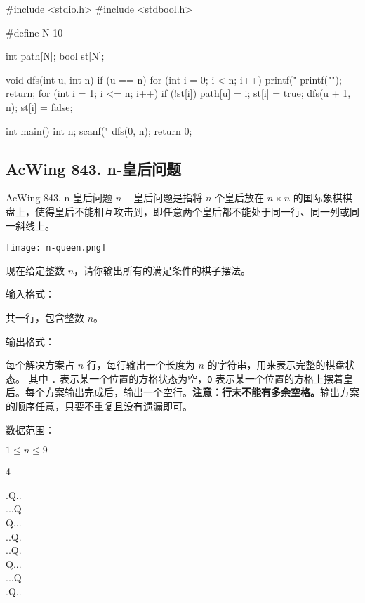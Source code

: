 \begin{mycpptwocol}[排列数字]
#include <stdio.h>
#include <stdbool.h>

#define N 10

int path[N];
bool st[N];

void dfs(int u, int n)
{
    if (u == n) {
        for (int i = 0; i < n; i++) {
            printf("%
        }
        printf("\n");
        return;
    }
    for (int i = 1; i <= n; i++) {
        if (!st[i]) {
            path[u] = i;
            st[i] = true;
            dfs(u + 1, n);
            st[i] = false;
        }
    }
}

int main()
{
    int n;
    scanf("%
    dfs(0, n);
    return 0;
}
\end{mycpptwocol}

\subsection{AcWing 843. n-皇后问题}
\begin{titledbox}{AcWing 843. n-皇后问题}
$n-$皇后问题是指将 $n$ 个皇后放在 $n \times n$ 的国际象棋棋盘上，使得皇后不能相互攻击到，即任意两个皇后都不能处于同一行、同一列或同一斜线上。

\texttt{[image: n-queen.png]}

现在给定整数 $n$，请你输出所有的满足条件的棋子摆法。

输入格式：

共一行，包含整数 $n$。

输出格式：

每个解决方案占 $n$ 行，每行输出一个长度为 $n$ 的字符串，用来表示完整的棋盘状态。
其中 \lstinline{.} 表示某一个位置的方格状态为空，\lstinline{Q} 表示某一个位置的方格上摆着皇后。每个方案输出完成后，输出一个空行。\textbf{注意：行末不能有多余空格。}输出方案的顺序任意，只要不重复且没有遗漏即可。

数据范围：

$1 \le n \le 9$

\begin{inputblock}
    4
\end{inputblock}
\begin{outputblock}
    .Q.. \\
    ...Q \\
    Q... \\
    ..Q. \\
    
    ..Q. \\
    Q... \\
    ...Q \\
    .Q..
\end{outputblock}
\end{titledbox}

